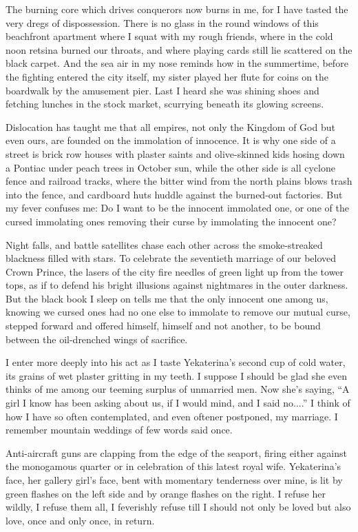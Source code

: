 \documentclass[english,11pt,letterpaper,onecolumn]{scrbook}
\begin{document}
	The burning core which drives conquerors now burns in me, for I have tasted the very dregs of dispossession.  There is no glass in the round windows of this beachfront apartment where I squat with my rough friends, where in the cold noon retsina burned our throats, and where playing cards still lie scattered on the black carpet.  And the sea air in my nose reminds how in the summertime, before the fighting entered the city itself, my sister played her flute for coins on the boardwalk by the amusement pier.  Last I heard she was shining shoes and fetching lunches in the stock market, scurrying beneath its glowing screens.

	Dislocation has taught me that all empires, not only the Kingdom of God but even ours, are founded on the immolation of innocence.  It is why one side of a street is brick row houses with plaster saints and olive-skinned kids hosing down a Pontiac under peach trees in October sun, while the other side is all cyclone fence and railroad tracks, where the bitter wind from the north plains blows trash into the fence, and cardboard huts huddle against the burned-out factories.  But my fever confuses me:  Do I want to be the innocent immolated one, or one of the cursed immolating ones removing their curse by immolating the innocent one?

	Night falls, and battle satellites chase each other across the smoke-streaked blackness filled with stars.  To celebrate the seventieth marriage of our beloved Crown Prince, the lasers of the city fire needles of green light up from the tower tops, as if to defend his bright illusions against nightmares in the outer darkness.  But the black book I sleep on tells me that the only innocent one among us, knowing we cursed ones had no one else to immolate to remove our mutual curse, stepped forward and offered himself, himself and not another, to be bound between the oil-drenched wings of sacrifice.

	I enter more deeply into his act as I taste Yekaterina's second cup of cold water, its grains of wet plaster gritting in my teeth.  I suppose I should be glad she even thinks of me among our teeming surplus of unmarried men.  Now she's saying, ``A girl I know has been asking about us, if I would mind, and I said no....''  I think of how I have so often contemplated, and even oftener postponed, my marriage.  I remember mountain weddings of few words said once.

	Anti-aircraft guns are clapping from the edge of the seaport, firing either against the monogamous quarter or in celebration of this latest royal wife.  Yekaterina's face, her gallery girl's face, bent with momentary tenderness over mine, is lit by green flashes on the left side and by orange flashes on the right.  I refuse her wildly, I refuse them all, I feverishly refuse till I should not only be loved but also love, once and only once, in return.
\end{document}
